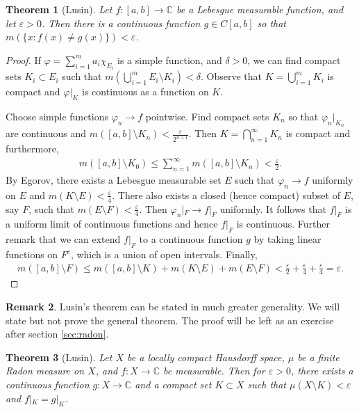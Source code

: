 \documentclass[11pt]{amsart}
\newtheorem{theorem}{Theorem}[section]
\theoremstyle{definition}
\newtheorem{remark}[theorem]{Remark}
\numberwithin{equation}{section}
\begin{document}
\begin{theorem}[Lusin]\label{lusin}
    Let $f:[a,b]\to\mathbb C$ be a Lebesgue measurable function, and let $\varepsilon>0$. Then there is a continuous function $g\in C[a,b]$ so that $m(\{x:f(x)\ne g(x)\})<\varepsilon$.
\end{theorem}
\begin{proof}
    If $\varphi=\sum_{i=1}^ma_i\chi_{E_i}$ is a simple function, and $\delta>0$, we can find compact sets $K_i\subset E_i$ such that $m(\bigcup_{i=1}^mE_i\setminus K_i)<\delta$. Observe that $K=\bigcup_{i=1}^mK_i$ is compact and $\varphi|_K$ is continuous as a function on $K$.

    Choose simple functions $\varphi_n\to f$ pointwise. Find compact sets $K_n$ so that $\varphi_n|_{K_n}$ are continuous and $m([a,b]\setminus K_n)<\frac{\varepsilon}{2^{n+1}}$. Then $K=\bigcap_{n=1}^\infty K_n$ is compact and furthermore,
    \begin{align*}
        m([a,b]\setminus K_0)\le\sum_{n=1}^\infty m([a,b]\setminus K_n)<\frac{\varepsilon}{2}.
    \end{align*}
    By Egorov, there exists a Lebesgue measurable set $E$ such that $\varphi_n\to f$ uniformly on $E$ and $m(K\setminus E)<\frac{\varepsilon}{4}$. There also exists a closed (hence compact) subset of $E$, say $F$, such that $m(E\setminus F)<\frac{\varepsilon}{4}$. Then $\varphi_n|_F\to f|_F$ uniformly. It follows that $f|_F$ is a uniform limit of continuous functions and hence $f|_F$ is continuous. Further remark that we can extend $f|_F$ to a continuous function $g$ by taking linear functions on $F^c$, which is a union of open intervals. Finally,
    \begin{align*}
        m([a,b]\setminus F)\le m([a,b]\setminus K)+m(K\setminus E)+m(E\setminus F)<\frac{\varepsilon}{2}+\frac{\varepsilon}{4}+\frac{\varepsilon}{4}=\varepsilon.
    \end{align*}
\end{proof}
\begin{remark}
    Lusin's theorem can be stated in much greater generality. We will state but not prove the general theorem. The proof will be left as an exercise after section \ref{sec:radon}.
\end{remark}
\begin{theorem}[Lusin]
    Let $X$ be a locally compact Hausdorff space, $\mu$ be a finite Radon measure on $X$, and $f:X\to\mathbb C$ be measurable. Then for $\varepsilon>0$, there exists a continuous function $g:X\to\mathbb C$ and a compact set $K\subset X$ such that $\mu(X\setminus K)<\varepsilon$ and $f|_K=g|_K$.
\end{theorem}
\newpage
\end{document}
